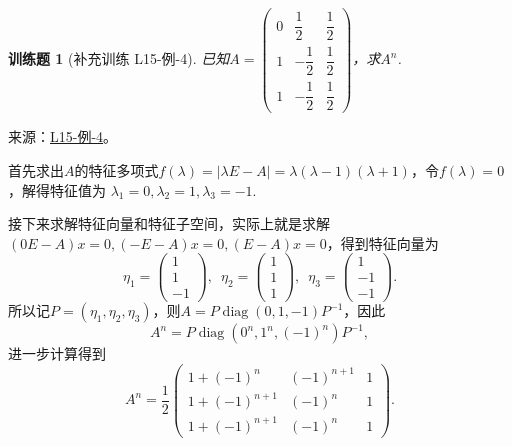 \documentclass[12pt,fontset=fandol]{ctexart}
\newtheorem{exercise}{训练题}[section]
\begin{document}
\begin{exercise}[补充训练 L15-例-4]\label{prob:L15-例-4}
已知$A=\begin{pmatrix}
            0 & \dfrac{1}{2}  & \dfrac{1}{2} \\[2ex]
            1 & -\dfrac{1}{2} & \dfrac{1}{2} \\[2ex]
            1 & -\dfrac{1}{2} & \dfrac{1}{2}
        \end{pmatrix}$，求$A^n$.
\end{exercise}
\noindent 来源：\href{https://github.com/yhwu-is/Linear-Algebra-Left-Undone/blob/new/%E8%AE%B2%E4%B9%89/%E4%B8%93%E9%A2%98/15%20%E7%9B%B8%E4%BC%BC%E6%A0%87%E5%87%86%E5%BD%A2%EF%BC%9A%E5%A4%8D%E6%95%B0%E5%9F%9F%E4%B8%8A%E7%9A%84%E5%B0%9D%E8%AF%95%E4%B8%8E%E7%90%86%E8%AE%BA.tex}{L15-例-4}。
\begin{solve}
首先求出$A$的特征多项式$f(\lambda)=|\lambda E-A|=\lambda(\lambda-1)(\lambda+1)$，令$f(\lambda)=0$，解得特征值为 $\lambda_1=0,\lambda_2=1,\lambda_3=-1$.

    接下来求解特征向量和特征子空间，实际上就是求解$(0E-A)x=0,(-E-A)x=0,(E-A)x=0$，得到特征向量为
    \[\eta_1=\begin{pmatrix}
            1 \\ 1 \\ -1
        \end{pmatrix},\enspace \eta_2=\begin{pmatrix}
            1 \\ 1 \\ 1
        \end{pmatrix},\enspace \eta_3=\begin{pmatrix}
            1 \\ -1 \\ -1
        \end{pmatrix}.\]
    所以记$P=(\eta_1,\eta_2,\eta_3)$，则$A=P\operatorname{diag}(0,1,-1)P^{-1}$，因此
    \[A^n=P\operatorname{diag}(0^n,1^n,(-1)^n)P^{-1},\]
    进一步计算得到
    \[A^n=\frac{1}{2}\begin{pmatrix}
            1+(-1)^n     & (-1)^{n+1} & 1 \\
            1+(-1)^{n+1} & (-1)^n     & 1 \\
            1+(-1)^{n+1} & (-1)^n     & 1
        \end{pmatrix}.\]
\end{solve}
\end{document}
